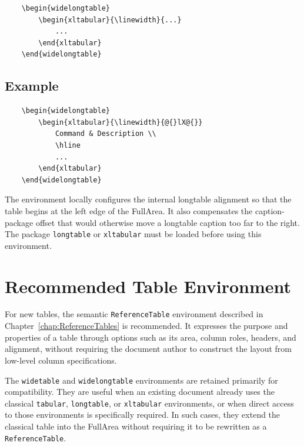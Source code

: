 \documentclass[
11pt,
a4paper,
oneside
]{scrbook}
\begin{document}
\begin{verbatim}
	\begin{widelongtable}
		\begin{xltabular}{\linewidth}{...}
			...
		\end{xltabular}
	\end{widelongtable}
\end{verbatim}
	
\subsection{Example}
	
\begin{verbatim}
	\begin{widelongtable}
		\begin{xltabular}{\linewidth}{@{}lX@{}}
			Command & Description \\
			\hline
			...
		\end{xltabular}
	\end{widelongtable}
\end{verbatim}
The environment locally configures the internal longtable alignment so that
the table begins at the left edge of the FullArea.
It also compensates the caption-package offset that would otherwise move a
longtable caption too far to the right.
The package \texttt{longtable} or \texttt{xltabular} must be loaded before
using this environment.

\section{Recommended Table Environment}

For new tables, the semantic \texttt{ReferenceTable} environment described in
Chapter~\ref{chap:ReferenceTables} is recommended. It expresses the purpose and
properties of a table through options such as its area, column roles, headers,
and alignment, without requiring the document author to construct the layout
from low-level column specifications.

The \texttt{widetable} and \texttt{widelongtable} environments are retained
primarily for compatibility. They are useful when an existing document already
uses the classical \texttt{tabular}, \texttt{longtable}, or \texttt{xltabular}
environments, or when direct access to those environments is specifically
required. In such cases, they extend the classical table into the FullArea
without requiring it to be rewritten as a \texttt{ReferenceTable}.
	
\end{document}
